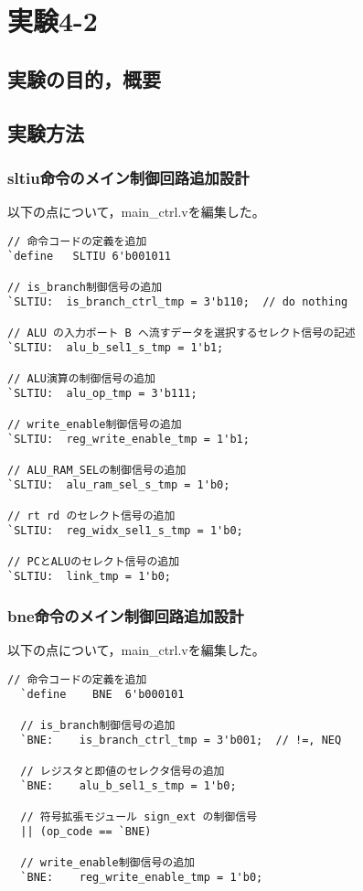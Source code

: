 \section{実験4-2}
\subsection{実験の目的，概要}

\subsection{実験方法}
\subsubsection{sltiu命令のメイン制御回路追加設計}
以下の点について，main\_ctrl.vを編集した。
\begin{lstlisting}[caption={sltiu命令の追加設計},label={sltiu命令の追加設計}]
// 命令コードの定義を追加
`define   SLTIU 6'b001011

// is_branch制御信号の追加
`SLTIU:  is_branch_ctrl_tmp = 3'b110;  // do nothing

// ALU の入力ポート B へ流すデータを選択するセレクト信号の記述
`SLTIU:  alu_b_sel1_s_tmp = 1'b1;

// ALU演算の制御信号の追加
`SLTIU:  alu_op_tmp = 3'b111;

// write_enable制御信号の追加
`SLTIU:  reg_write_enable_tmp = 1'b1;

// ALU_RAM_SELの制御信号の追加
`SLTIU:  alu_ram_sel_s_tmp = 1'b0;

// rt rd のセレクト信号の追加
`SLTIU:  reg_widx_sel1_s_tmp = 1'b0;

// PCとALUのセレクト信号の追加
`SLTIU:  link_tmp = 1'b0;
\end{lstlisting}

\subsubsection{bne命令のメイン制御回路追加設計}
以下の点について，main\_ctrl.vを編集した。
\begin{lstlisting}[caption={bne命令の追加設計},label={bne命令の追加設計}]
  // 命令コードの定義を追加
  `define    BNE  6'b000101

  // is_branch制御信号の追加
  `BNE:    is_branch_ctrl_tmp = 3'b001;  // !=, NEQ

  // レジスタと即値のセレクタ信号の追加
  `BNE:    alu_b_sel1_s_tmp = 1'b0;

  // 符号拡張モジュール sign_ext の制御信号
  || (op_code == `BNE)                       

  // write_enable制御信号の追加
  `BNE:    reg_write_enable_tmp = 1'b0;
\end{lstlisting}


